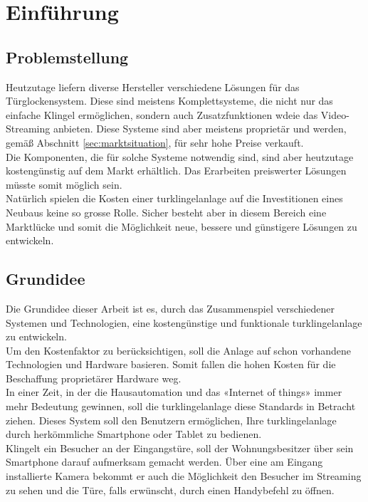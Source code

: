 \section{Einführung}
\label{sec:chapterexample}

\subsection{Problemstellung}
\label{sec:chapterexample}

Heutzutage liefern diverse Hersteller verschiedene Lösungen für das Türglockensystem. Diese sind meistens Komplettsysteme, die nicht nur das einfache Klingel ermöglichen, sondern auch Zusatzfunktionen wdeie das Video-Streaming anbieten. Diese Systeme sind aber meistens proprietär und werden, gemäß Abschnitt \ref{sec:marktsituation},  für sehr hohe Preise verkauft.
\\
Die Komponenten, die für solche Systeme notwendig sind, sind aber heutzutage kostengünstig auf dem Markt erhältlich. Das Erarbeiten preiswerter Lösungen müsste somit möglich sein.
\\
Natürlich spielen die Kosten einer \gls{turklingelanlage} auf die Investitionen eines Neubaus keine so grosse Rolle. Sicher besteht aber in diesem Bereich eine Marktlücke und somit die Möglichkeit neue, bessere und günstigere Lösungen zu entwickeln.

\subsection{Grundidee}
\label{sec:grundidee}
Die Grundidee dieser Arbeit ist es, durch das Zusammenspiel verschiedener Systemen und Technologien, eine kostengünstige und funktionale \gls{turklingelanlage} zu entwickeln.
\\ 
Um den Kostenfaktor zu berücksichtigen, soll die Anlage auf schon vorhandene Technologien und Hardware basieren. Somit fallen die hohen Kosten für die Beschaffung proprietärer Hardware weg.
\\
In einer Zeit, in der die Hausautomation und das «Internet of things» immer mehr Bedeutung gewinnen, soll die \gls{turklingelanlage} diese Standards in Betracht ziehen. Dieses System soll den Benutzern ermöglichen, Ihre \gls{turklingelanlage} durch herkömmliche Smartphone oder Tablet zu bedienen.
\\
Klingelt ein Besucher an der Eingangstüre, soll der Wohnungsbesitzer über sein Smartphone darauf aufmerksam gemacht werden. Über eine am Eingang installierte Kamera  bekommt er auch die Möglichkeit den Besucher im Streaming zu sehen und die Türe, falls erwünscht, durch einen Handybefehl zu öffnen.
\newpage
